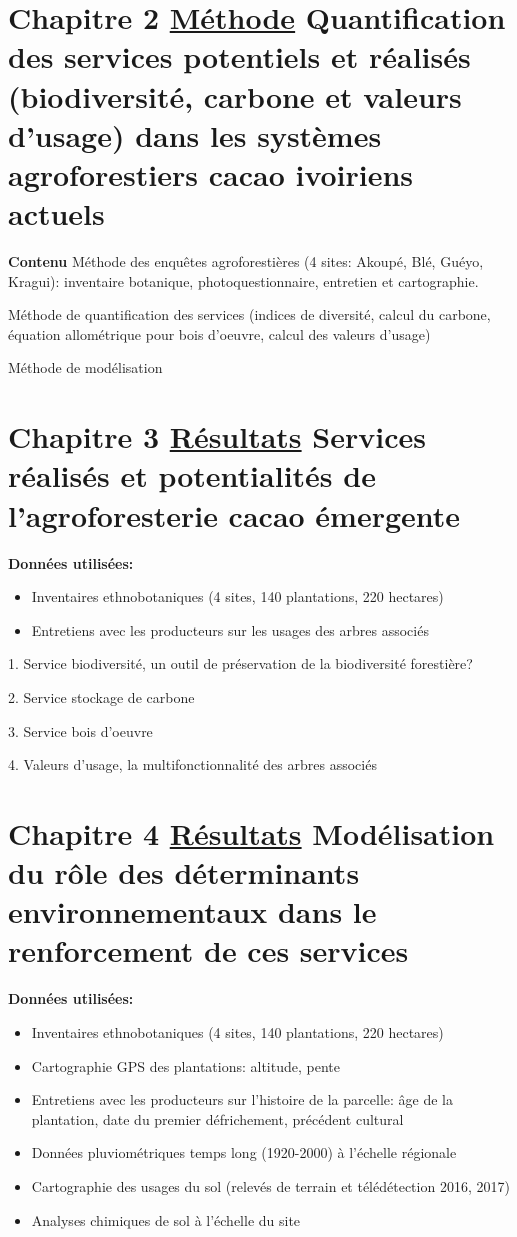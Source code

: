 \documentclass[a4paper,notitlepage]{article}
\begin{document}
\section*{Chapitre 2 \underline{Méthode} Quantification des services potentiels et réalisés (biodiversité, carbone et valeurs d'usage) dans les systèmes agroforestiers cacao ivoiriens actuels}
\textbf{Contenu} Méthode des enquêtes agroforestières (4 sites: Akoupé, Blé, Guéyo, Kragui): inventaire botanique, photoquestionnaire, entretien et cartographie.

Méthode de quantification des services (indices de diversité, calcul du carbone, équation allométrique pour bois d'oeuvre, calcul des valeurs d'usage)

Méthode de modélisation

\section*{Chapitre 3 \underline{Résultats} Services réalisés et potentialités de l'agroforesterie cacao émergente}
\textbf{Données utilisées:}
\begin{itemize} 
\item{Inventaires ethnobotaniques (4 sites, 140 plantations, 220 hectares)}
\item{Entretiens avec les producteurs sur les usages des arbres associés}
\end{itemize}
\vspace{1cm}

1. Service biodiversité, un outil de préservation de la biodiversité forestière?

2. Service stockage de carbone 

3. Service bois d'oeuvre

4. Valeurs d'usage, la multifonctionnalité des arbres associés


\section*{Chapitre 4 \underline{Résultats} Modélisation du rôle des déterminants environnementaux dans le renforcement de ces services}

\textbf{Données utilisées:}
\begin{itemize} 
\item{Inventaires ethnobotaniques (4 sites, 140 plantations, 220 hectares)}
\item{Cartographie GPS des plantations: altitude, pente}
\item{Entretiens avec les producteurs sur l'histoire de la parcelle: âge de la plantation, date du premier défrichement, précédent cultural}
\item{Données pluviométriques temps long (1920-2000) à l'échelle régionale}
\item{Cartographie des usages du sol (relevés de terrain et télédétection 2016, 2017)}
\item{Analyses chimiques de sol à l'échelle du site}
\end{itemize}
\end{document}
